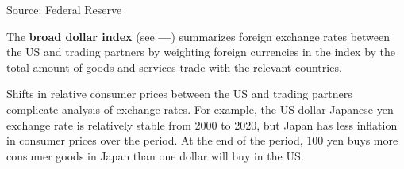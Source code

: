 \documentclass{report}
\makeatletter
\newcommand{\tbllink}[1]{\href{https://raw.githubusercontent.com/bdecon/US-chartbook/master/chartbook/data/#1}{\faTable}}
\newcommand*\short[1]{\expandafter\@gobbletwo\number\numexpr#1\relax}
\newcommand{\absnode}[3]{\node[below right, align=left] at (axis cs: #1,#2) {#3};}
\newcommand{\dateaxisticks}{
		date coordinates in=x, axis line style={draw=none},
		xmax={2024-01-31},
		max space between ticks=40,	    
		xtick={{1990-01-01}, {1992-01-01}, {1994-01-01}, 
			{1996-01-01}, {1998-01-01}, {2000-01-01}, 
			{2002-01-01}, {2004-01-01}, {2006-01-01},
			{2008-01-01}, {2010-01-01}, {2012-01-01}, {2014-01-01},
		    {2016-01-01}, {2018-01-01}, {2020-01-01}, {2022-01-01}, 
		    {2024-01-01}, {2026-01-01}},
		minor xtick={{1989-01-01}, {1991-01-01}, {1993-01-01},
			{1995-01-01}, {1997-01-01}, {1999-01-01}, 
			{2001-01-01}, {2003-01-01}, {2005-01-01}, {2007-01-01},
		    {2009-01-01}, {2011-01-01}, {2013-01-01}, {2015-01-01},
		    {2017-01-01}, {2019-01-01}, {2021-01-01}, {2023-01-01}, 
		    {2025-01-01}, {2027-01-01}},
		enlarge y limits={0.06}, enlarge x limits={0.01},
		xticklabel style={align=center, yshift=-2pt}, tick label style={inner sep=0pt},
		}
\newcommand{\bbar}[2]{extra #1 ticks = {{#2}}, extra #1 tick labels = ,
		extra #1 tick style = {grid=major, grid style={thick, black!25}},}
\newcommand{\stdline}[4]{\addplot[very thick, no markers, color=#1] 
		table [x=#2, y=#3, col sep=comma] {#4};	}
\newcommand{\recbars}{
		\fill[color=black!10] (axis cs:{2007-12-01},\pgfkeysvalueof{/pgfplots/ymin})
			rectangle (axis cs:{2009-07-01}, \pgfkeysvalueof{/pgfplots/ymax});
		\fill[color=black!10] (axis cs:{2020-02-01},\pgfkeysvalueof{/pgfplots/ymin}) 
			rectangle (axis cs:{2020-05-01}, \pgfkeysvalueof{/pgfplots/ymax});}
\makeatother
\begin{document}
{\begin{minipage}{1.0\textwidth}
\begin{minipage}{0.46\textwidth}
\hspace{4mm} 
\vspace{3.35cm}

\footnotesize{Source: Federal Reserve} \hfill \tbllink{fx_idx.csv}
\end{minipage}\hfill
\begin{minipage}{0.47\textwidth}
\small The \textbf{broad dollar index} (see {\color{blue!60!black}\textbf{---}}) summarizes foreign exchange rates between the US and trading partners by weighting foreign currencies in the index by the total amount of goods and services trade with the relevant countries.




\end{minipage}
\end{minipage}
\newpage
\vspace*{-8mm}

\begin{minipage}{1.0\textwidth}   
\small Shifts in relative consumer prices between the US and trading partners complicate analysis of exchange rates. For example, the US dollar-Japanese yen exchange rate is relatively stable from 2000 to 2020, but Japan has less inflation in consumer prices over the period. At the end of the period, 100 yen buys more consumer goods in Japan than one dollar will buy in the US. 


\end{minipage}}
\end{document}

